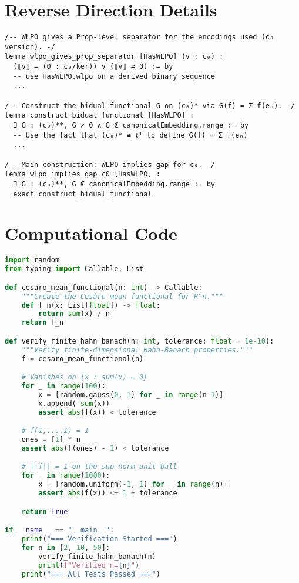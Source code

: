 \documentclass[11pt]{article}  %
\begin{document}
\section{Reverse Direction Details}

\begin{lstlisting}[caption={Lemma structure for WLPO ⇒ Gap}]
/-- WLPO gives a Prop-level separator for the encodings used (c₀ version). -/
lemma wlpo_gives_prop_separator [HasWLPO] (v : c₀) :
  (⟦v⟧ = (0 : c₀/ker)) ∨ (⟦v⟧ ≠ 0) := by
  -- use HasWLPO.wlpo on a derived binary sequence
  ...

/-- Construct the bidual functional G on (c₀)* via G(f) = Σ f(eₙ). -/
lemma construct_bidual_functional [HasWLPO] :
  ∃ G : (c₀)**, G ≠ 0 ∧ G ∉ canonicalEmbedding.range := by
  -- Use the fact that (c₀)* ≅ ℓ¹ to define G(f) = Σ f(eₙ)
  ...

/-- Main construction: WLPO implies gap for c₀. -/
lemma wlpo_implies_gap_c0 [HasWLPO] :
  ∃ G : (c₀)**, G ∉ canonicalEmbedding.range := by
  exact construct_bidual_functional
\end{lstlisting}

\section{Computational Code}\label{app:computational}

\begin{lstlisting}[language=Python, caption={Finite Hahn--Banach verification (Cesàro means)}]
import random
from typing import Callable, List

def cesaro_mean_functional(n: int) -> Callable:
    """Create the Cesàro mean functional for R^n."""
    def f_n(x: List[float]) -> float:
        return sum(x) / n
    return f_n

def verify_finite_hahn_banach(n: int, tolerance: float = 1e-10):
    """Verify finite-dimensional Hahn-Banach properties."""
    f = cesaro_mean_functional(n)

    # Vanishes on {x : sum(x) = 0}
    for _ in range(100):
        x = [random.gauss(0, 1) for _ in range(n-1)]
        x.append(-sum(x))
        assert abs(f(x)) < tolerance

    # f(1,...,1) = 1
    ones = [1] * n
    assert abs(f(ones) - 1) < tolerance

    # ||f|| = 1 on the sup-norm unit ball
    for _ in range(1000):
        x = [random.uniform(-1, 1) for _ in range(n)]
        assert abs(f(x)) <= 1 + tolerance

    return True

if __name__ == "__main__":
    print("=== Verification Started ===")
    for n in [2, 10, 50]:
        verify_finite_hahn_banach(n)
        print(f"Verified n={n}")
    print("=== All Tests Passed ===")
\end{lstlisting}
\end{document}
